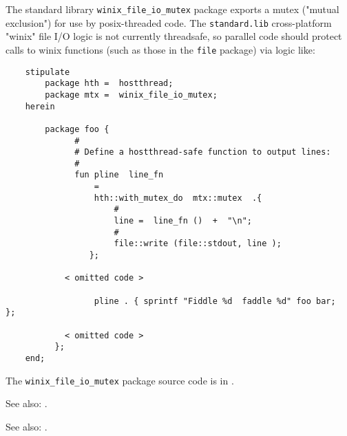 
The standard library {\tt winix\_file\_io\_mutex} package exports a mutex ("mutual exclusion") 
for use by posix-threaded code.  The {\tt standard.lib} cross-platform "winix" file I/O logic 
is not currently threadsafe, so parallel code should protect calls to winix functions (such 
as those in the {\tt file} package) via logic like:

\begin{verbatim}
    stipulate
        package hth =  hostthread;
        package mtx =  winix_file_io_mutex;
    herein
    
        package foo {
              #
              # Define a hostthread-safe function to output lines:
              #
              fun pline  line_fn
                  =
                  hth::with_mutex_do  mtx::mutex  .{
                      #
                      line =  line_fn ()  +  "\n";
                      #
                      file::write (file::stdout, line );
                 };
    
            < omitted code >

                  pline . { sprintf "Fiddle %d  faddle %d" foo bar;  };
                
            < omitted code >
          };
    end;
\end{verbatim}

The {\tt winix\_file\_io\_mutex} package source code is in .

See also:    .

See also:    .

